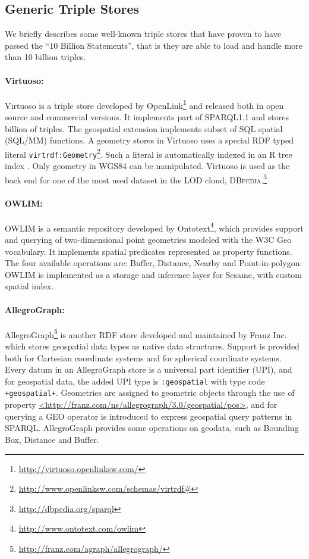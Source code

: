 \subsection{Generic Triple Stores}
\label{sec:genrictps}
We briefly describes some well-known triple stores that have proven to have passed the ``10 Billion Statements'', that is they are able to load and handle more than 10 billion triples.

\paragraph{Virtuoso:}
Virtuoso is a triple store developed by OpenLink\footnote{\url{http://virtuoso.openlinksw.com/}} and released both in open source and commercial versions. It implements part of SPARQL1.1 and stores billion of triples. The geospatial extension implements subset of SQL spatial (SQL/MM) \cite{ashworth99} functions. A geometry stores in Virtuoso uses a special RDF typed literal \texttt{virtrdf:Geometry}\footnote{\url{http://www.openlinksw.com/schemas/virtrdf\#}}. Such a literal is automatically indexed in an R tree index \cite{rtree84}. Only geometry in WGS84 can be manipulated. Virtuoso is used as the back end for one of the most used dataset in the LOD cloud, \textsc{DBpedia.}\footnote{\url{http://dbpedia.org/sparql}}

\paragraph{OWLIM:}
OWLIM is a semantic repository developed by Ontotext\footnote{\url{http://www.ontotext.com/owlim}}, which provides support and querying of
two-dimensional point geometries modeled with the W3C Geo vocabulary. It implements spatial predicates represented as property functions. The  four available operations are: Buffer, Distance, Nearby and Point-in-polygon. OWLIM is implemented as a storage and inference layer for Sesame, with custom spatial index.

\paragraph{AllegroGraph:}
AllegroGraph\footnote{\url{http://franz.com/agraph/allegrograph/}} is another RDF store developed and maintained by Franz Inc. which stores geospatial data types as native data structures. Support is provided both for Cartesian coordinate systems and for spherical coordinate systems. Every datum in an AllegroGraph store is a universal part identifier (UPI), and for geospatial data, the added UPI type is \texttt{:geospatial} with type code \texttt{+geospatial+}. Geometries are assigned to geometric objects through the use of property \url{<http://franz.com/ns/allegrograph/3.0/geospatial/pos>}, and for querying a GEO operator is introduced to express geospatial query patterns in SPARQL. AllegroGraph provides some operations on geodata, such as Bounding Box, Distance and Buffer.

